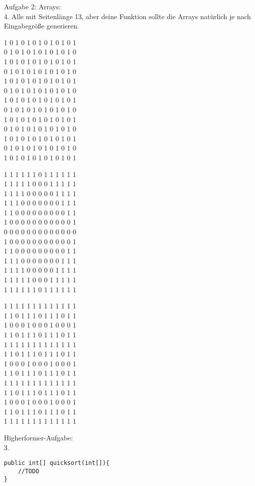 \documentclass{../../sheet}
\begin{document}
\newpage
{}
\hypertarget{Aufgabe_4}{}
Aufgabe 2: Arrays:\\
4. Alle mit Seitenlänge 13, aber deine Funktion sollte die Arrays natürlich je nach Eingabegröße generieren.
\begin{ausgabe}
    1 0 1 0 1 0 1 0 1 0 1 0 1 \\
    0 1 0 1 0 1 0 1 0 1 0 1 0 \\
    1 0 1 0 1 0 1 0 1 0 1 0 1 \\
    0 1 0 1 0 1 0 1 0 1 0 1 0 \\
    1 0 1 0 1 0 1 0 1 0 1 0 1 \\
    0 1 0 1 0 1 0 1 0 1 0 1 0 \\
    1 0 1 0 1 0 1 0 1 0 1 0 1 \\
    0 1 0 1 0 1 0 1 0 1 0 1 0 \\
    1 0 1 0 1 0 1 0 1 0 1 0 1 \\
    0 1 0 1 0 1 0 1 0 1 0 1 0 \\
    1 0 1 0 1 0 1 0 1 0 1 0 1 \\
    0 1 0 1 0 1 0 1 0 1 0 1 0 \\
    1 0 1 0 1 0 1 0 1 0 1 0 1
\end{ausgabe}
\begin{ausgabe}
    1 1 1 1 1 1 0 1 1 1 1 1 1 \\
    1 1 1 1 1 0 0 0 1 1 1 1 1 \\
    1 1 1 1 0 0 0 0 0 1 1 1 1 \\
    1 1 1 0 0 0 0 0 0 0 1 1 1 \\
    1 1 0 0 0 0 0 0 0 0 0 1 1 \\
    1 0 0 0 0 0 0 0 0 0 0 0 1 \\
    0 0 0 0 0 0 0 0 0 0 0 0 0 \\
    1 0 0 0 0 0 0 0 0 0 0 0 1 \\
    1 1 0 0 0 0 0 0 0 0 0 1 1 \\
    1 1 1 0 0 0 0 0 0 0 1 1 1 \\
    1 1 1 1 0 0 0 0 0 1 1 1 1 \\
    1 1 1 1 1 0 0 0 1 1 1 1 1 \\
    1 1 1 1 1 1 0 1 1 1 1 1 1
\end{ausgabe}
\begin{ausgabe}
    1 1 1 1 1 1 1 1 1 1 1 1 1 \\
    1 1 0 1 1 1 0 1 1 1 0 1 1 \\
    1 0 0 0 1 0 0 0 1 0 0 0 1 \\
    1 1 0 1 1 1 0 1 1 1 0 1 1 \\
    1 1 1 1 1 1 1 1 1 1 1 1 1 \\
    1 1 0 1 1 1 0 1 1 1 0 1 1 \\
    1 0 0 0 1 0 0 0 1 0 0 0 1 \\
    1 1 0 1 1 1 0 1 1 1 0 1 1 \\
    1 1 1 1 1 1 1 1 1 1 1 1 1 \\
    1 1 0 1 1 1 0 1 1 1 0 1 1 \\
    1 0 0 0 1 0 0 0 1 0 0 0 1 \\
    1 1 0 1 1 1 0 1 1 1 0 1 1 \\
    1 1 1 1 1 1 1 1 1 1 1 1 1
\end{ausgabe}

Higherformer-Aufgabe:\\
3.
\hypertarget{Highperformer}{}
\begin{verbatim}
public int[] quicksort(int[]){
    //TODO
}
\end{verbatim}
\end{document}
